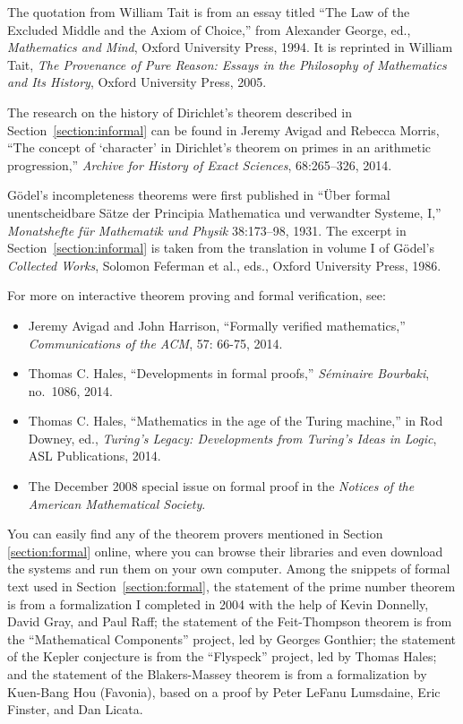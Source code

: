 \documentclass[12pt]{article}
\begin{document}
The quotation from William Tait is from an essay titled ``The Law of the Excluded Middle and the Axiom of Choice,'' from Alexander George, ed., \emph{Mathematics and Mind}, Oxford University Press, 1994. It is reprinted in William Tait, \emph{The Provenance of Pure Reason: Essays in the Philosophy of Mathematics and Its History}, Oxford University Press, 2005.

The research on the history of Dirichlet's theorem described in Section~\ref{section:informal} can be found in Jeremy Avigad and Rebecca Morris, ``The concept of `character' in Dirichlet’s theorem on primes in an arithmetic progression,'' \emph{Archive for History of Exact Sciences}, 68:265--326, 2014.

G\"odel's incompleteness theorems were first published in ``\"Uber formal unentscheidbare S\"atze der Principia Mathematica und verwandter Systeme, I,'' \emph{Monatshefte f\"ur Mathematik und Physik} 38:173--98, 1931. The excerpt in Section~\ref{section:informal} is taken from the translation in volume I of G\"odel's \emph{Collected Works}, Solomon Feferman et al., eds., Oxford University Press, 1986.

For more on interactive theorem proving and formal verification, see:
\begin{itemize}
 \item Jeremy Avigad and John Harrison, ``Formally verified mathematics,'' \emph{Communications of the ACM}, 57: 66-75, 2014.
 \item Thomas C. Hales, ``Developments in formal proofs,'' \emph{S\'eminaire Bourbaki}, no.~1086, 2014.
 \item Thomas C. Hales, ``Mathematics in the age of the Turing machine,'' in Rod Downey, ed., \emph{Turing's Legacy: Developments from Turing's Ideas in Logic}, ASL Publications, 2014.
 \item The December 2008 special issue on formal proof in the \emph{Notices of the American Mathematical Society}.
\end{itemize}
You can easily find any of the theorem provers mentioned in Section \ref{section:formal} online, where you can browse their libraries and even download the systems and run them on your own computer. Among the snippets of formal text used in Section~\ref{section:formal}, the statement of the prime number theorem is from a formalization I completed in 2004 with the help of Kevin Donnelly, David Gray, and Paul Raff; the statement of the Feit-Thompson theorem is from the ``Mathematical Components'' project, led by Georges Gonthier; the statement of the Kepler conjecture is from the ``Flyspeck'' project, led by Thomas Hales; and the statement of the Blakers-Massey theorem is from a formalization by Kuen-Bang Hou (Favonia), based on a proof by Peter LeFanu Lumsdaine, Eric Finster, and Dan Licata.
\end{document}
